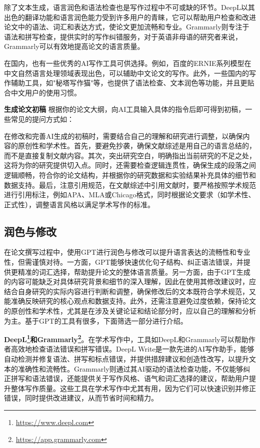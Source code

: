 除了文本生成，语言润色和语法检查也是写作过程中不可或缺的环节。DeepL以其出色的翻译功能和语言润色能力受到许多用户的青睐，它可以帮助用户检查和改进论文中的语法、词汇和表达方式，使论文更加流畅和专业。Grammarly则专注于语法和拼写检查，提供实时的写作纠错服务，对于英语非母语的研究者来说，Grammarly可以有效地提高论文的语言质量。

在国内，也有一些优秀的AI写作工具可供选择。例如，百度的ERNIE系列模型在中文自然语言处理领域表现出色，可以辅助中文论文的写作。此外，一些国内的写作辅助工具，如"秘塔写作猫"等，也提供了语法检查、文本润色等功能，并且更贴合中文用户的使用习惯。


\textbf{生成论文初稿}
根据你的论文大纲，向AI工具输入具体的指令后即可得到初稿，一些常见的提问方式如：

在修改和完善AI生成的初稿时，需要结合自己的理解和研究进行调整，以确保内容的原创性和学术性。首先，要避免抄袭，确保文献综述是用自己的语言总结的，而不是直接复制文献内容。其次，突出研究空白，明确指出当前研究的不足之处，这将为你的研究提供切入点。同时，还需要检查逻辑连贯性，确保生成的段落之间逻辑顺畅，符合你的论文结构，并根据你的研究数据和实验结果补充具体的细节和数据支持。最后，注意引用规范，在文献综述中引用文献时，要严格按照学术规范进行引用标注，例如APA、MLA或Chicago格式，同时根据论文要求（如学术性、正式性），调整语言风格以满足学术写作的标准。

\subsection{润色与修改}

在论文撰写过程中，使用GPT进行润色与修改可以提升语言表达的流畅性和专业性，但需谨慎对待。一方面，GPT能够快速优化句子结构、纠正语法错误，并提供更精准的词汇选择，帮助提升论文的整体语言质量。另一方面，由于GPT生成的内容可能缺乏对具体研究背景和细节的深入理解，因此在使用其修改建议时，应结合自身研究的实际内容进行判断和调整，确保修改后的文本既符合学术规范，又能准确反映研究的核心观点和数据支持。此外，还需注意避免过度依赖，保持论文的原创性和学术性，尤其是在涉及关键论证和结论部分时，应以自己的理解和分析为主。基于GPT的工具有很多，下面筛选一部分进行介绍。

\textbf{DeepL\footnote{\url{https://www.deepl.com}}和Grammarly\footnote{\url{https://app.grammarly.com}}}。在学术写作中，工具如DeepL和Grammarly可以帮助作者高效地检查语法错误和拼写错误。DeepL Write是一款先进的AI写作助手，能够自动检测并修复语法、拼写和标点错误，并提供措辞建议和创造性改写，以提升文本的准确性和流畅性。Grammarly则通过其AI驱动的语法检查功能，不仅能够纠正拼写和语法错误，还能提供关于写作风格、语气和词汇选择的建议，帮助用户提升整体写作质量。这些工具在学术写作中尤其有用，因为它们可以快速识别并修正错误，同时提供改进建议，从而节省时间和精力。

